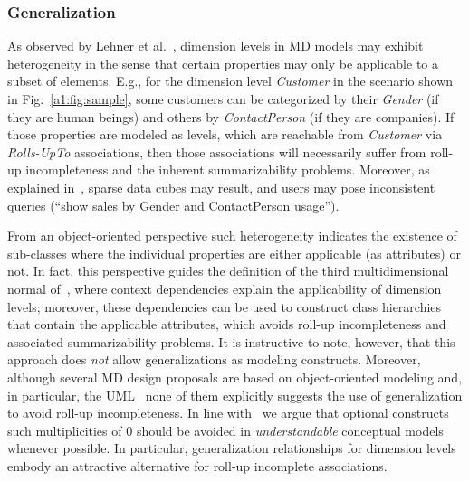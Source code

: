 \subsubsection{Generalization}
As observed by Lehner et al.~\cite{DBLP:conf/ssdbm/LehnerAW98},
dimension levels in MD models may exhibit heterogeneity in the sense
that certain properties may only be applicable to a subset of
elements. E.g., for the dimension level \textit{Customer} in the
scenario shown in Fig.~\ref{a1:fig:sample}, some customers can be
categorized by their \textit{Gender} (if they are human beings) and
others by \textit{ContactPerson} (if they are companies).  If those
properties are modeled as levels, which are reachable from
\textit{Customer} via \emph{Rolls-UpTo} associations, then those
associations will necessarily suffer from roll-up incompleteness and
the inherent summarizability problems. Moreover, as explained
in~\cite{DBLP:conf/ssdbm/LehnerAW98}, sparse data cubes may result,
and users may pose inconsistent queries (``show sales by Gender and
ContactPerson usage'').

From an object-oriented perspective such heterogeneity indicates the
existence of sub-classes where the individual properties are either
applicable (as attributes) or not.  In fact, this perspective guides
the definition of the third multidimensional normal
of~\cite{DBLP:journals/is/LechtenborgerV03}, where context
dependencies explain the applicability of dimension levels;
moreover, these dependencies can be used to construct class
hierarchies that contain the applicable attributes, which avoids
roll-up incompleteness and associated summarizability problems.  It
is instructive to note, however, that this approach does \emph{not}
allow generalizations as modeling constructs.  Moreover, although
several MD design proposals are based on object-oriented modeling
and, in particular, the
UML~\cite{DBLP:journals/is/AbelloSS06,DBLP:journals/dke/Lujan-MoraTS06,DBLP:journals/dss/PratAC06}
none of them explicitly suggests the use of generalization to avoid
roll-up incompleteness.  In line with~\cite{Bodart01} we argue that
optional constructs such multiplicities of $0$ should be avoided in
\emph{understandable} conceptual models whenever possible.  In
particular, generalization relationships for dimension levels embody
an attractive alternative for roll-up incomplete associations.

